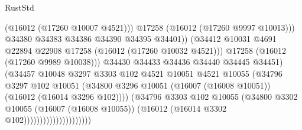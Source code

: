 \begin{lexlean}{RustStd}
\begin{coremodule}
                                                (@16012 (@17260 @10007 @4521)))
                                              @17258
                                              (@16012 (@17260 @9997 @10013)))
                                            @34380
                                            @34383
                                            @34386
                                            @34390
                                            @34395
                                            @34401))
                                        (@34412
                                          @10031
                                          @4691
                                          @22894
                                          @22908
                                          @17258
                                          (@16012 (@17260 @10032 @4521)))
                                        @17258
                                        (@16012 (@17260 @9989 @10038)))
                                      @34430
                                      @34433
                                      @34436
                                      @34440
                                      @34445
                                      @34451)
                                    (@34457
                                      @10048
                                      @3297
                                      @3303
                                      @102
                                      @4521
                                      @10051
                                      @4521
                                      @10055
                                      (@34796
                                        @3297
                                        @102
                                        @10051
                                        (@34800
                                          @3296
                                          @10051
                                          (@16007 (@16008 @10051))
                                          (@16012 (@16014 @3296 @102))))
                                      (@34796
                                        @3303
                                        @102
                                        @10055
                                        (@34800
                                          @3302
                                          @10055
                                          (@16007 (@16008 @10055))
                                          (@16012 (@16014 @3302 @102)))))))))))))))))))))

\end{coremodule}
\end{lexlean}
